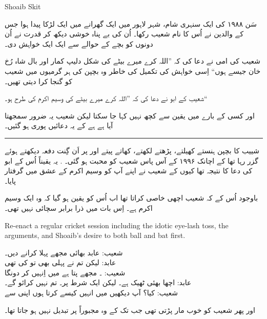 \documentclass{article}
\begin{document}
\begin{center} \LARGE
	Shoaib Skit
\end{center}

\startUrdu

سَن ۱۹۸۸ کی ایک سنہری شام، شہر لاہور میں ایک گھرانے میں ایک لڑکا پیدا ہوا جس کے والدین نے اُس کا نام شعیب رکھا۔ اُن کی بے پناہ خوشی دیکھ کر قدرت نے اُن دونوں کو بچے کے حوالے سے ایک ایک خواہش دی۔ 

شعیب کی امی نے دعا کی کہ ''اللہ کرے میرے بیٹے کی شکل دلیپ کمار اور بال شاہ رُخ خان جیسے ہوں`` اِسی خواہش کی تکمیل کی خاطر وہ بچپن کی ہر گرمیوں میں شعیب کو گنجا کرا دیتی تھیں۔ 

شعیب کے ابو نے دعا کی کہ ''اللہ کرے میرے بیٹے کی  وسیم اکرم کی طرح ہو۔``

اور کسی کے بارے میں یقین سے کچھ نہیں کہا جا سکتا لیکن شعیب یہ ضرور سمجھتا آیا ہے ہے کے یہ دعائیں پوری ہو گئیں۔

\rule{\textwidth}{1pt}

شییب کا بچپن ہنستے کھیلتے، پڑھتے لکھتے،  کھاتے پیتے اور  پر اَن گِنت دفعہ  دیکھتے ہوئے گزر رہا تھا کے اچانک ۱۹۹۶ کے آس پاس شعیب کو محبت ہو گئی۔ . یہ یقیناً اُس کے ابو کی دعا کا نتیجہ تھا کیوں کے شعیب نے اپنے آپ کو وسیم اکرم کے عشق میں گرفتار پایا۔

باوجود اُس کے کہ شعیب اچھی خاصی  کراتا تھا اب اُس کو یقین ہو گیا کہ وہ ایک  وسیم اکرم ہے۔ اِس بات میں ذرا برابر سچائی نہیں تھی۔

\begin{enpara}
	Re-enact a regular cricket session including the idotic eye-lash toss, the arguments, and Shoaib's desire to both ball and bat first.
\end{enpara}

\vspace{0.5\baselineskip}
شعیب:  عابد بھائی مجھے پہلا  کرانے دیں۔\\
عابد: لیکن تم نے پہلی  بھی تو کی تھی\\
شعیب: ۔ مجھے پتا ہے میں اِنہیں  کر دونگا\\
عابد: اچھا بھئی ٹھیک ہے۔ لیکن ایک شرط پر۔ تم  نہیں کرائو گے۔\\
شعیب: کیا؟ آپ دیکھیں میں انہیں کیسے  کرتا ہوں اپنی  سے

اور پھر شعیب کو خوب مار پڑتی تھی جب تک کے وہ مجبوراً  پر تبدیل نہیں ہو جاتا تھا۔
\end{document}
